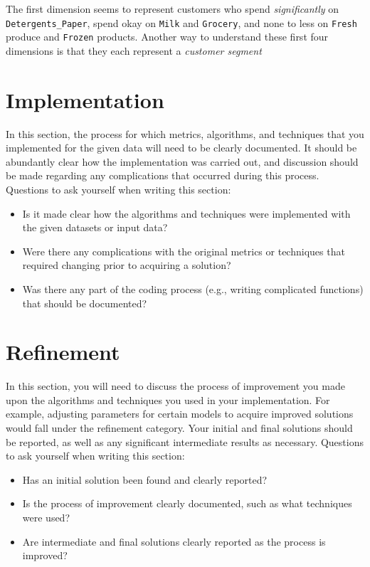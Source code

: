 \documentclass[twoside,openright,titlepage,numbers=noenddot,headinclude,%
               footinclude=true,cleardoublepage=empty,abstractoff,BCOR=5mm,%
               paper=a4,fontsize=11pt,ngerman,american]{scrreprt}
\numberwithin{theorem}{chapter}
\numberwithin{definition}{chapter}
\numberwithin{algorithm}{chapter}
\numberwithin{figure}{chapter}
\numberwithin{table}{chapter}
\numberwithin{equation}{chapter}
\begin{document}
The first dimension seems to represent customers who spend \emph{significantly} on \texttt{Detergents\_Paper}, spend okay on \texttt{Milk} and \texttt{Grocery}, and none to less on \texttt{Fresh} produce and \texttt{Frozen} products. Another way to understand these first four dimensions is that they each represent a \emph{customer segment}

\section*{Implementation}
In this section, the process for which metrics, algorithms, and techniques that you implemented for the given data will need to be clearly documented. It should be abundantly clear how the implementation was carried out, and discussion should be made regarding any complications that occurred during this process. Questions to ask yourself when writing this section:
\begin{itemize}%
\item Is it made clear how the algorithms and techniques were implemented with the given datasets or input data?
\item Were there any complications with the original metrics or techniques that required changing prior to acquiring a solution?
\item Was there any part of the coding process (e.g., writing complicated functions) that should be documented?
\end{itemize}


\section*{Refinement}
In this section, you will need to discuss the process of improvement you made upon the algorithms and techniques you used in your implementation. For example, adjusting parameters for certain models to acquire improved solutions would fall under the refinement category. Your initial and final solutions should be reported, as well as any significant intermediate results as necessary. Questions to ask yourself when writing this section:
\begin{itemize}%
\item Has an initial solution been found and clearly reported?
\item Is the process of improvement clearly documented, such as what techniques were used?
\item Are intermediate and final solutions clearly reported as the process is improved?
\end{itemize}
\end{document}
